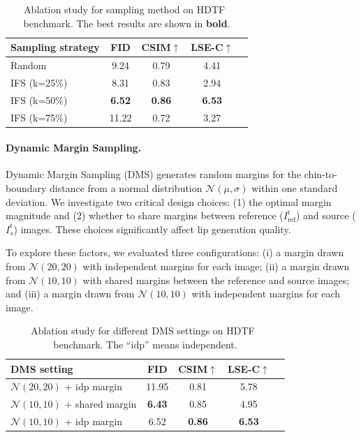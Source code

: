 \begin{table}[t]
\begin{center}
\begin{tabular}{lcccc}
\toprule
\multicolumn{1}{c}{\bf Sampling strategy}  & \multicolumn{1}{c}{\bf FID}  & \multicolumn{1}{c}{\bf CSIM$\uparrow$} & \multicolumn{1}{c}{\bf LSE-C$\uparrow$}  \\
\midrule
Random & 9.24 & 0.79 & 4.41 \\
IFS (k=25\%) & 8.31 & 0.83 & 2.94 \\
IFS (k=50\%)  & \textbf{6.52} & \textbf{0.86} & \textbf{6.53} \\
IFS (k=75\%)  & 11.22 & 0.72 & 3.27 \\
\bottomrule
\end{tabular}
\caption{Ablation study for sampling method on HDTF~\cite{zhang2021flow} benchmark.
The best results are shown in \textbf{bold}.}
\label{ablation-IFS}
\end{center}
\end{table}

\paragraph{Dynamic Margin Sampling.}
Dynamic Margin Sampling (DMS) generates random margins for the chin-to-boundary distance from a normal distribution \( \mathcal{N}(\mu, \sigma) \) within one standard deviation. We investigate two critical design choices: (1) the optimal margin magnitude and (2) whether to share margins between reference (\( I_{\text{ref}}^{t} \)) and source (\( I_{s}^{t} \)) images. These choices significantly affect lip generation quality.

To explore these factors, we evaluated three configurations: 
(i) a margin drawn from \( \mathcal{N}(20, 20) \) with independent margins for each image; 
(ii) a margin drawn from \( \mathcal{N}(10, 10) \) with shared margins between the reference and source images; and 
(iii) a margin drawn from \( \mathcal{N}(10, 10) \) with independent margins for each image.

\begin{table}[t]
\begin{center}
\begin{tabular}{lcccc}
\toprule
\multicolumn{1}{l}{\bf DMS setting}  & \multicolumn{1}{c}{\bf FID}  & \multicolumn{1}{c}{\bf CSIM$\uparrow$} & \multicolumn{1}{c}{\bf LSE-C$\uparrow$}  \\
\midrule
 \( \mathcal N(20,20) \) + idp margin & 11.95 & 0.81 & 5.78 \\
 \( \mathcal N(10,10) \) + shared margin & \textbf{6.43} & 0.85 & 4.95 \\
 \( \mathcal N(10,10) \) + idp margin  & 6.52 & \textbf{0.86} & \textbf{6.53} \\
\bottomrule
\end{tabular}
\caption{Ablation study for different DMS settings on HDTF~\cite{zhang2021flow} benchmark.
The ``idp'' means independent.}
\label{ablation-DMS}
\end{center}
\end{table}

